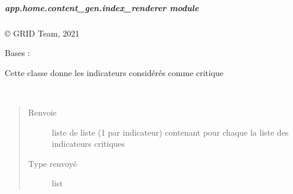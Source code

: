 \documentclass[letterpaper,10pt,french]{sphinxmanual}
\begin{document}
\subparagraph{app.home.content\_gen.index\_renderer module}
\label{\detokenize{app.home.content_gen:module-app.home.content_gen.index_renderer}}\label{\detokenize{app.home.content_gen:app-home-content-gen-index-renderer-module}}
\sphinxAtStartPar
© GRID Team, 2021

\begin{fulllineitems}
\label{\detokenize{app.home.content_gen:app.home.content_gen.index_renderer.CriticalAlert}}
\sphinxAtStartPar
Bases : 

\sphinxAtStartPar
Cette classe donne les indicateurs considérés comme critique

\begin{fulllineitems}
\label{\detokenize{app.home.content_gen:app.home.content_gen.index_renderer.CriticalAlert.main}}~\begin{quote}\begin{description}
\item[{Renvoie}] \leavevmode
\sphinxAtStartPar
liste de liste (1 par indicateur) contenant pour chaque la liste des indicateurs critiques

\item[{Type renvoyé}] \leavevmode
\sphinxAtStartPar
list

\end{description}\end{quote}

\end{fulllineitems}


\end{fulllineitems}

\end{document}
